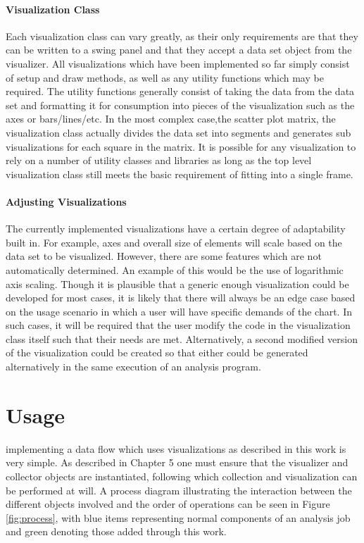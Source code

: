 \paragraph{Visualization Class}
Each visualization class can vary greatly, as their only requirements are that they can be written to a swing panel and that they accept a data set object from the visualizer. All visualizations which have been implemented so far simply consist of setup and draw methods, as well as any utility functions which may be required. The utility functions generally consist of taking the data from the data set and formatting it for consumption into pieces of the visualization such as the axes or bars/lines/etc. In the most complex case,the scatter plot matrix, the visualization class actually divides the data set into segments and generates sub visualizations for each square in the matrix. It is possible for any visualization to rely on a number of utility classes and libraries as long as the top level visualization class still meets the basic requirement of fitting into a single frame. 

\paragraph{Adjusting Visualizations}
The currently implemented visualizations have a certain degree of adaptability built in. For example, axes and overall size of elements will scale based on the data set to be visualized. However, there are some features which are not automatically determined. An example of this would be the use of logarithmic axis scaling. Though it is plausible that a generic enough visualization could be developed for most cases, it is likely that there will always be an edge case based on the usage scenario in which a user will have specific demands of the chart. In such cases, it will be required that the user modify the code in the visualization class itself such that their needs are met. Alternatively, a second modified version of the visualization could be created so that either could be generated alternatively in the same execution of an analysis program. 

\section{Usage}
\label{usage}
 implementing a data flow which uses visualizations as described in this work is very simple. As described in Chapter 5 one must ensure that the visualizer and collector objects are instantiated, following which collection and visualization can be performed at will. A process diagram illustrating the interaction between the different objects involved and the order of operations can be seen in Figure \ref{fig:process}, with blue items representing normal components of an analysis job and green denoting those added through this work.

